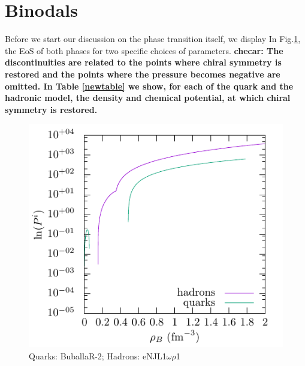 \documentclass[prc, reprint, amsmath, floatfix,10pt]{revtex4-1}
\begin{document}
\section{Binodals}

Before we start our discussion on the phase transition itself, we display In Fig.\ref{eos}, the EoS of
both phases for two specific choices of parameters. {\bf checar: The
discontinuities are related to the points where chiral symmetry is
restored and the points where the pressure becomes negative are
omitted. In Table \ref{newtable} we show, for each of the quark and
the hadronic model, the density and chemical potential, at which
chiral symmetry is restored.} 

\begin{figure}
	\includegraphics[width=\linewidth]{graph/BuballaR_2-eNJL1OmegaRho1-quark-hadron_phase_transition2.pdf}
	\caption{Quarks: BuballaR-2; Hadrons: eNJL1$\omega\rho$1
\label{eos}}
\end{figure}
\end{document}
